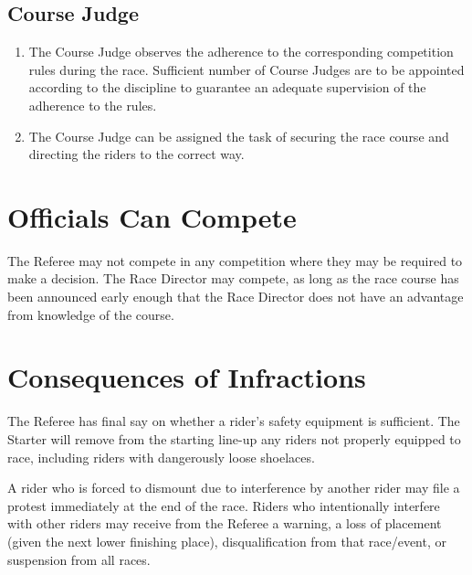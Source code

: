 \subsection{Course Judge}
	\begin{enumerate}[leftmargin=1.5em,labelsep=*]
		\item The Course Judge observes the adherence to the corresponding competition rules during the race.
		Sufficient number of Course Judges are to be appointed according to the discipline to guarantee an adequate supervision of the adherence to the rules.
		\item The Course Judge can be assigned the task of securing the race course and directing the riders to the correct way.
	\end{enumerate}

\section{Officials Can Compete}

The Referee may not compete in any competition where they may be required to make a decision.
The Race Director may compete, as long as the race course has been announced early enough that the Race Director does not have an advantage from knowledge of the course.

\section{Consequences of Infractions}

The Referee has final say on whether a rider's safety equipment is sufficient.
The Starter will remove from the starting line-up any riders not properly equipped to race, including riders with dangerously loose shoelaces.

A rider who is forced to dismount due to interference by another rider may file a protest immediately at the end of the race.
Riders who intentionally interfere with other riders may receive from the Referee a warning, a loss of placement (given the next lower finishing place), 
disqualification from that race/event, or suspension from all races.

